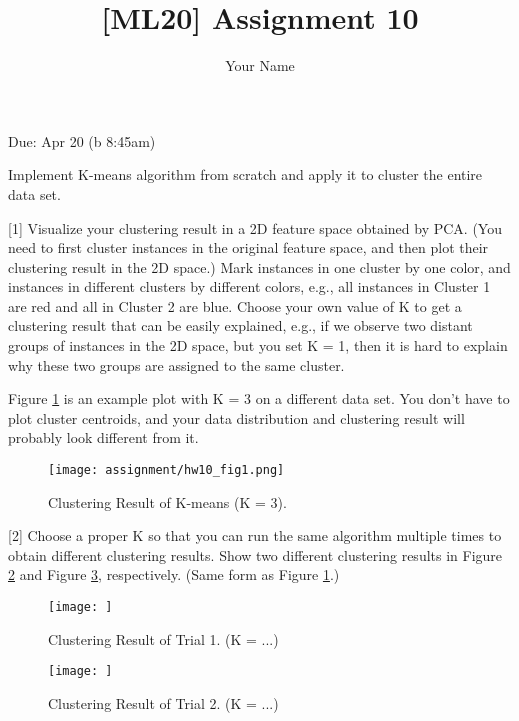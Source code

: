 \documentclass{llncs}
\title{[ML20] Assignment 10}
\author{Your Name}
\institute{}
\begin{document}
\maketitle 

\setlength\parindent{0pt} 
\setlength{\parskip}{10pt}

Due: Apr 20 (b 8:45am) 

Implement K-means algorithm from scratch 
and apply it to cluster the entire data set. 

[1] Visualize your clustering result in a 2D 
feature space obtained by PCA. (You need to 
first cluster instances in the original feature 
space, and then plot their clustering result in 
the 2D space.) 
Mark instances in one cluster by one color, 
and instances in different clusters by different 
colors, e.g., all instances 
in Cluster 1 are red and all in Cluster 2 are blue. 
Choose your own value of K to get a clustering 
result that can be easily explained, 
e.g., if we observe two distant groups of instances 
in the 2D space, but you set K = 1, then it is hard to 
explain why these two groups are assigned to the same 
cluster. 

Figure \ref{hw10_fig1} is an example plot with 
K = 3 on a different data set. You don't have to 
plot cluster centroids,
and your data distribution and clustering result will probably look different from it. 

\begin{figure}[h!] 
\centering 
\texttt{[image: assignment/hw10\_fig1.png]} 
\caption{Clustering Result of K-means (K = 3).} 
\label{hw10_fig1}
\end{figure}

[2] Choose a proper K so that you can run 
the same algorithm multiple times to obtain 
different clustering results. Show two different 
clustering results in Figure \ref{hw10_fig2} 
and Figure \ref{hw10_fig3}, respectively. 
(Same form as Figure \ref{hw10_fig1}.)

\begin{figure}[h!] 
\centering 
\texttt{[image: ]} 
\caption{Clustering Result of Trial 1. 
(K = ...) } 
\label{hw10_fig2}
\end{figure}

\begin{figure}[h!] 
\centering 
\texttt{[image: ]} 
\caption{Clustering Result of Trial 2. 
(K = ...) } 
\label{hw10_fig3}
\end{figure}
\end{document}
